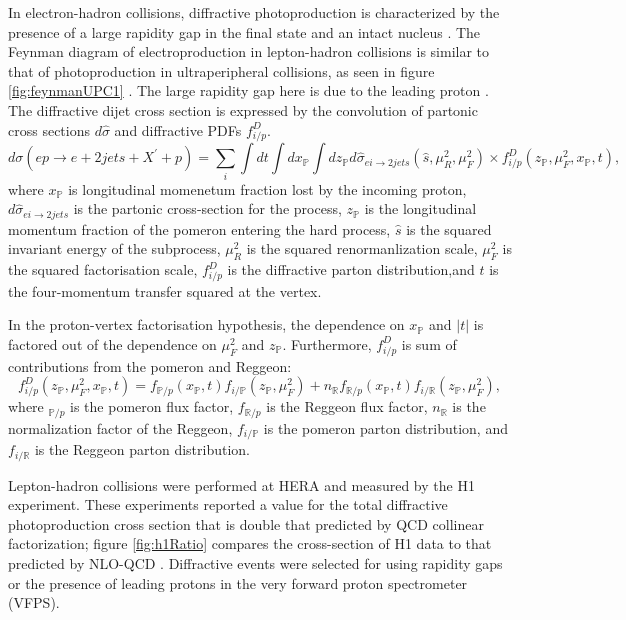 In electron-hadron collisions, diffractive photoproduction is characterized by the presence of a large rapidity gap in the final state and an intact nucleus \cite{Frankfurt:2006tp}\cite{Alexa:2013xxa}\cite{Aktas:2006qs}. The Feynman diagram of electroproduction in lepton-hadron collisions is similar to that of photoproduction in ultraperipheral collisions, as seen in figure \ref{fig:feynmanUPC1} \cite{Andreev:2015cwa}. The large rapidity gap here is due to the leading proton \cite{Aaron:2010aa}. The diffractive dijet cross section is expressed by the convolution of partonic cross sections $d\hat{\sigma}$ and diffractive PDFs $f^D_{i/p}$.
\begin{equation}
d\sigma (ep \rightarrow e + 2 jets + X^{'} + p) = \sum_{i} \int dt \int dx_\mathbb{P} \int dz_\mathbb{P}d\hat{\sigma}_{ei\rightarrow 2jets}(\hat{s},\mu^2_R,\mu^2_F)\times f^D_{i/p}(z_\mathbb{P},\mu^2_F,x_\mathbb{P},t) ,
\end{equation}
where $x_\mathbb{P}$ is longitudinal momenetum fraction lost by the incoming proton, $d\hat{\sigma}_{ei\rightarrow 2jets}$ is the partonic cross-section for the process, $z_\mathbb{P}$ is the longitudinal momentum fraction of the pomeron entering the hard process, $\hat{s}$ is the squared invariant energy of the subprocess, $\mu^2_R$ is the squared renormanlization scale, $\mu^2_F$ is the squared factorisation scale, $f^D_{i/p}$ is the diffractive parton distribution,and $t$ is the four-momentum transfer squared at the vertex. 

In the proton-vertex factorisation hypothesis, the dependence on $x_{\mathbb{P}}$ and $|t|$ is factored out of the dependence on $\mu^2_F$ and $z_{\mathbb{P}}$. Furthermore, $f^D_{i/p}$ is sum of contributions from the pomeron and Reggeon:
\begin{equation}
f^D_{i/p}(z_{\mathbb{P}},\mu^2_F,x_{\mathbb{P}},t) = f_{\mathbb{P}/p}(x_{\mathbb{P}},t)f_{i/\mathbb{P}}(z_{\mathbb{P}},\mu^2_F) + n_\mathbb{R}f_{\mathbb{R}/p}(x_{\mathbb{P}},t)f_{i/\mathbb{R}}(z_{\mathbb{P}},
\mu^2_F) ,
\end{equation}
where $_{\mathbb{P}/p}$ is the pomeron flux factor, $f_{\mathbb{R}/p}$ is the Reggeon flux factor, $n_\mathbb{R}$ is the normalization factor of the Reggeon, $f_{i/\mathbb{P}}$ is the pomeron parton distribution, and $f_{i/\mathbb{R}}$ is the Reggeon parton distribution.

Lepton-hadron collisions were performed at HERA and measured by the H1 experiment. These experiments reported a value for the total diffractive photoproduction cross section that is double that predicted by QCD collinear factorization; figure \ref{fig:h1Ratio} compares the cross-section of H1 data to that predicted by NLO-QCD \cite{Andreev:2015cwa}. Diffractive events were selected for using rapidity gaps or the presence of leading protons in the very forward proton spectrometer (VFPS). 

